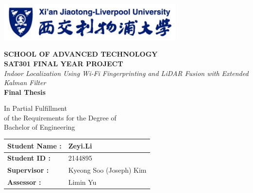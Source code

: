 \documentclass[12pt,a4paper]{article}
\numberwithin{equation}{section}
\begin{document}
\onehalfspacing  %

\begin{titlepage}
    \centering
    \vspace*{-1cm}
    \includegraphics[width=0.7\textwidth]{images/xjtlu.png}
 \vspace{1cm}

    {\large \textbf{SCHOOL OF ADVANCED TECHNOLOGY}}\\[0.3cm]
    {\large \textbf{SAT301 FINAL YEAR PROJECT}}\\[3cm]
    {\Large \textit{Indoor Localization Using Wi-Fi Fingerprinting and LiDAR Fusion with Extended Kalman Filter}}\\[2cm]
    {\LARGE \textbf{Final Thesis}}\\[4cm]

\begin{center}
\large
In Partial Fulfillment\\
of the Requirements for the Degree of\\
Bachelor of Engineering
\end{center}

\vfill
\begin{table}[H]
    \centering
    \begin{tabular}{|l|l|}
        \hline
        \textbf{Student Name :} & Zeyi.Li \\ \hline
        \textbf{Student ID :}   & 2144895 \\ \hline
        \textbf{Supervisor :}   & Kyeong Soo (Joseph) Kim \\ \hline
        \textbf{Assessor :}     & Limin Yu\\ \hline
    \end{tabular}
\end{table}
\end{titlepage}

\end{document}
